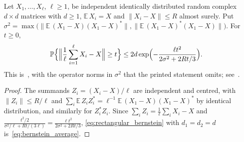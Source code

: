 \begin{theorem}
    \label{thm:bernstein_average}
    \leanok
    Let $X_1,\dots,X_\ell$, $\ell\ge1$, be independent identically distributed
    random complex $d\times d$ matrices with $d\ge1$, $\mathbb{E}\,X_i=X$ and
    $\|X_i-X\|\le R$ almost surely. Put
    $\sigma^{2}=\max\bigl(\|\mathbb{E}\,(X_1-X)(X_1-X)^{*}\|,
        \|\mathbb{E}\,(X_1-X)^{*}(X_1-X)\|\bigr)$. For $t\ge0$,
    \begin{align}
        \label{eq:bernstein_average}
        \mathbb{P}\Bigl\{\Bigl\|\frac1\ell\sum_{i=1}^{\ell}X_i-X\Bigr\|\ge t\Bigr\}
        \le2d\exp\Bigl(-\frac{\ell t^{2}}{2\sigma^{2}+2Rt/3}\Bigr).
    \end{align}
    This is~\cite[Theorem~t:mcb]{Landau2013PolynomialTime}, with the operator
    norms in $\sigma^{2}$ that the printed statement omits;
    see~\cite{gap:lvv13_matrix_bernstein_variance_norm}.
\end{theorem}
\begin{proof}\leanok
    The summands $Z_i=(X_i-X)/\ell$ are independent and centred, with
    $\|Z_i\|\le R/\ell$ and
    $\sum_i\mathbb{E}\,Z_iZ_i^{*}=\ell^{-1}\mathbb{E}\,(X_1-X)(X_1-X)^{*}$ by
    identical distribution, and similarly for $Z_i^{*}Z_i$. Since
    $\sum_iZ_i=\frac1\ell\sum_iX_i-X$ and
    $\frac{t^{2}/2}{\sigma^{2}/\ell+Rt/(3\ell)}=\frac{\ell t^{2}}{2\sigma^{2}+2Rt/3}$,
    \eqref{eq:rectangular_bernstein} with $d_1=d_2=d$ is~\eqref{eq:bernstein_average}.
\end{proof}
